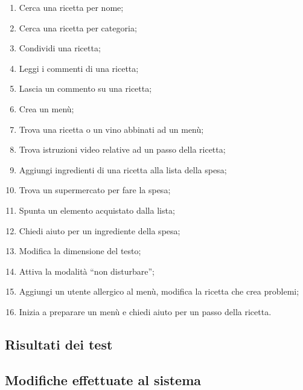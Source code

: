 \begin{enumerate}
 \item Cerca una ricetta per nome;
 \item Cerca una ricetta per categoria;
 \item Condividi una ricetta;
 \item Leggi i commenti di una ricetta;
 \item Lascia un commento su una ricetta;
 \item Crea un menù;
 \item Trova una ricetta o un vino abbinati ad un menù;
 \item Trova istruzioni video relative ad un passo della ricetta;
 \item Aggiungi ingredienti di una ricetta alla lista della spesa;
 \item Trova un supermercato per fare la spesa;
 \item Spunta un elemento acquistato dalla lista;
 \item Chiedi aiuto per un ingrediente della spesa;
 \item Modifica la dimensione del testo;
 \item Attiva la modalità ``non disturbare'';
 \item Aggiungi un utente allergico al menù, modifica la ricetta che crea problemi;
 \item Inizia a preparare un menù e chiedi aiuto per un passo della ricetta.
\end{enumerate}

\subsection{Risultati dei test}
\subsection{Modifiche effettuate al sistema}
